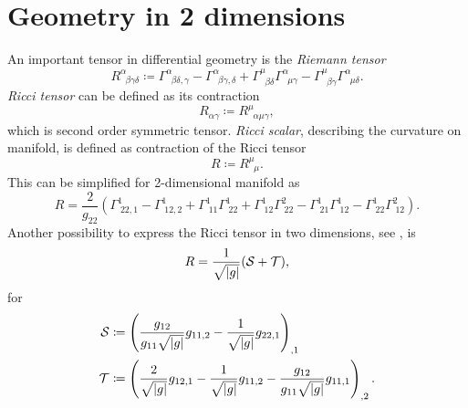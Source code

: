 \section{Geometry in 2 dimensions}
An important tensor in differential geometry is the \emph{Riemann tensor}
\begin{equation}
    R^\alpha_{\;\;\beta\gamma\delta}\coloneqq \Gamma^\alpha_{\;\;\beta\delta,\gamma}-\Gamma^\alpha_{\;\;\beta\gamma,\delta}+\Gamma^\mu_{\;\;\beta\delta}\Gamma^\alpha_{\;\;\mu\gamma}-\Gamma^\mu_{\;\;\beta\gamma}\Gamma^\alpha_{\;\;\mu\delta}.
\end{equation}
\emph{Ricci tensor} can be defined as its contraction 
\begin{equation}
    R_{\alpha\gamma}\coloneqq R^\mu_{\;\;\alpha\mu\gamma},
\end{equation}
which is second order symmetric tensor.
\emph{Ricci scalar}, describing the curvature on manifold, is defined as contraction of the Ricci tensor
\begin{equation}
    R\coloneqq R^\mu_{\;\;\mu}.
\end{equation}
This can be simplified for 2-dimensional manifold as
\begin{equation}
    R=\frac{2}{g_{22}}\left(\Gamma^1_{\;22,1}-\Gamma^1_{\;12,2}+\Gamma^1_{\;11}\Gamma^1_{\;22}+\Gamma^1_{\;12}\Gamma^2_{\;22}-\Gamma^1_{\;21}\Gamma^1_{\;12}-\Gamma^1_{\;22}\Gamma^2_{\;12}\right).
    \label{eq:Ricci2D}
\end{equation}
Another possibility to express the Ricci tensor in two dimensions, see \citet[eq. 6,7]{geometricTensorLipkin}, is
\begin{equation}
    R=\frac{1}{\sqrt{\left|{g}\right|}}(\mathcal{S}+\mathcal{T}),
\end{equation}
for
\begin{align}
    \mathcal{S}&\coloneqq \left(\frac{g_{12}}{g_{11}\sqrt{\left|{g}\right|}}g_{11,2}-\frac{1}{\sqrt{\left|{g}\right|}}g_{22,1}\right)_{,1}\\
    \mathcal{T}&\coloneqq \left(\frac{2}{\sqrt{\left|{g}\right|}}g_{12,1}-\frac{1}{\sqrt{\left|{g}\right|}}g_{11,2}-\frac{g_{12}}{g_{11}\sqrt{\left|{g}\right|}}g_{11,1}\right)_{,2}.
\end{align}

